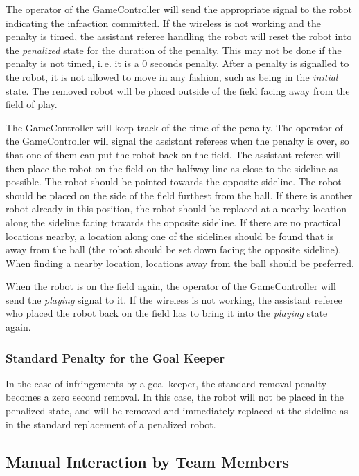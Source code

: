 \documentclass[12pt]{article}
\newcommand{\ie}{\mbox{i.\,e.}\xspace}
\begin{document}
The operator of the GameController will send the appropriate signal
to the robot indicating the infraction committed.
If the wireless is
not working and the penalty is timed, the assistant referee handling
the robot will reset the robot into the \emph{penalized} state for
the duration of the penalty.
This may not be done if the penalty is not
timed, \ie it is a 0 seconds penalty. After a penalty is signalled
to the robot, it is not allowed to move in any fashion, such as being
in the \emph{initial} state. The removed robot will be placed
outside of the field facing away from the field of play.

The GameController will keep track of the time of the penalty. The
operator of the GameController will signal the assistant referees
when the penalty is over, so that one of them can put the robot back
on the field. The assistant referee will then place the robot on the
field on the halfway line as close to the sideline as possible.  The
robot should be pointed towards the opposite sideline.  The robot
should be placed on the side of the field furthest from the ball.
If there is another robot already in this position, the robot should
be replaced at a nearby location along the sideline facing towards
the opposite sideline.  If there are no practical locations nearby,
a location along one of the sidelines should be found that is away
from the ball (the robot should be set down facing the opposite
sideline).  When finding a nearby location, locations away from the
ball should be preferred.

When the robot is on the field again, the operator of the
GameController will send the \emph{playing} signal to it.
If the
wireless is not working, the assistant referee who placed the robot
back on the field has to bring it into the \emph{playing} state
again.

\subsubsection{Standard Penalty for the Goal Keeper}\label{sec:goal_keeper_standard_penalty}

In the case of infringements by a goal keeper, the standard removal penalty becomes a zero second removal. In this case, the robot will not be placed in the penalized state, and will be removed and immediately replaced at the sideline as in the standard replacement of a penalized robot.

\subsection{Manual Interaction by Team Members}
\end{document}
